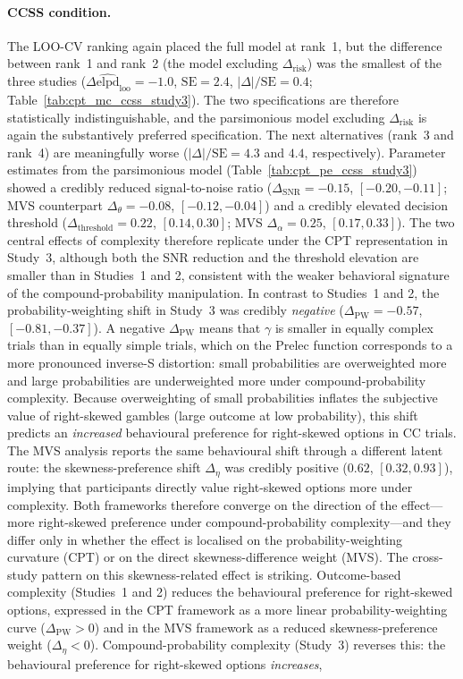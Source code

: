 \documentclass[man,floatsintext]{apa7}
\begin{document}
\paragraph{CCSS condition.} The LOO-CV ranking again placed the full model at rank~1, but the difference between rank~1 and rank~2 (the model excluding $\Delta_{\text{risk}}$) was the smallest of the three studies ($\Delta\widehat{\mathrm{elpd}}_{\mathrm{loo}} = -1.0$, $\mathrm{SE} = 2.4$, $|\Delta|/\mathrm{SE} = 0.4$; Table~\ref{tab:cpt_mc_ccss_study3}). The two specifications are therefore statistically indistinguishable, and the parsimonious model excluding $\Delta_{\text{risk}}$ is again the substantively preferred specification. The next alternatives (rank~3 and rank~4) are meaningfully worse ($|\Delta|/\mathrm{SE} = 4.3$ and $4.4$, respectively). Parameter estimates from the parsimonious model (Table~\ref{tab:cpt_pe_ccss_study3}) showed a credibly reduced signal-to-noise ratio (\textbf{$\Delta_{\text{SNR}} = -0.15$}, $[-0.20, -0.11]$; MVS counterpart $\Delta_\theta = -0.08$, $[-0.12, -0.04]$) and a credibly elevated decision threshold (\textbf{$\Delta_{\text{threshold}} = 0.22$}, $[0.14, 0.30]$; MVS $\Delta_\alpha = 0.25$, $[0.17, 0.33]$). The two central effects of complexity therefore replicate under the CPT representation in Study~3, although both the SNR reduction and the threshold elevation are smaller than in Studies~1 and 2, consistent with the weaker behavioral signature of the compound-probability manipulation. In contrast to Studies~1 and 2, the probability-weighting shift in Study~3 was credibly \emph{negative} (\textbf{$\Delta_{\text{PW}} = -0.57$}, $[-0.81, -0.37]$). A negative $\Delta_{\text{PW}}$ means that $\gamma$ is smaller in equally complex trials than in equally simple trials, which on the Prelec function corresponds to a more pronounced inverse-S distortion: small probabilities are overweighted more and large probabilities are underweighted more under compound-probability complexity. Because overweighting of small probabilities inflates the subjective value of right-skewed gambles (large outcome at low probability), this shift predicts an \emph{increased} behavioural preference for right-skewed options in CC trials. The MVS analysis reports the same behavioural shift through a different latent route: the skewness-preference shift $\Delta_\eta$ was credibly positive ($0.62$, $[0.32, 0.93]$), implying that participants directly value right-skewed options more under complexity. Both frameworks therefore converge on the direction of the effect---more right-skewed preference under compound-probability complexity---and they differ only in whether the effect is localised on the probability-weighting curvature (CPT) or on the direct skewness-difference weight (MVS). The cross-study pattern on this skewness-related effect is striking. Outcome-based complexity (Studies~1 and 2) reduces the behavioural preference for right-skewed options, expressed in the CPT framework as a more linear probability-weighting curve ($\Delta_{\text{PW}} > 0$) and in the MVS framework as a reduced skewness-preference weight ($\Delta_\eta < 0$). Compound-probability complexity (Study~3) reverses this: the behavioural preference for right-skewed options \emph{increases}, 
\end{document}
